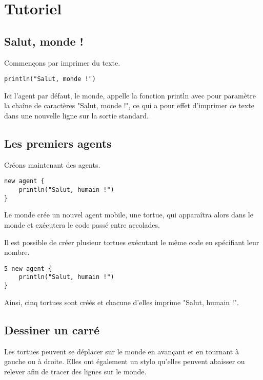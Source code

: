 \section{Tutoriel}

\subsection{Salut, monde !}

Commençons par imprimer du texte.

\begin{lstlisting}[language=Stibbons]
println("Salut, monde !")
\end{lstlisting}

Ici l'agent par défaut, le monde, appelle la fonction println avec pour paramètre la chaîne de caractères "Salut, monde !", ce qui a pour effet d'imprimer ce texte dans une nouvelle ligne sur la sortie standard.

\subsection{Les premiers agents}

Créons maintenant des agents.

\begin{lstlisting}[language=Stibbons]
new agent {
    println("Salut, humain !")
}
\end{lstlisting}

Le monde crée un nouvel agent mobile, une tortue, qui apparaîtra alors dans le monde et exécutera le code passé entre accolades.

Il est possible de créer plusieur tortues exécutant le même code en spécifiant leur nombre.

\begin{lstlisting}[language=Stibbons]
5 new agent {
    println("Salut, humain !")
}
\end{lstlisting}

Ainsi, cinq tortues sont créés et chacune d'elles imprime "Salut, humain !".

\subsection{Dessiner un carré}

Les tortues peuvent se déplacer sur le monde en avançant et en tournant à gauche ou à droite. Elles ont également un stylo qu'elles peuvent abaisser ou relever afin de tracer des lignes sur le monde.

